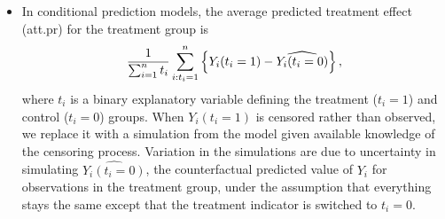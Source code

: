 \documentclass[letterpaper,10pt,english]{sphinxmanual}
\begin{document}
\begin{itemize}
\item {} 
In conditional prediction models, the average predicted treatment
effect (att.pr) for the treatment group is
\begin{gather}
\begin{split}\frac{1}{\sum_{i=1}^n t_i}\sum_{i:t_i=1}^n \left\{ Y_i(t_i=1) -
      \widehat{Y_i(t_i=0)} \right\},\end{split}\notag
\end{gather}
where \(t_i\) is a binary explanatory variable defining the
treatment (\(t_i=1\)) and control (\(t_i=0\)) groups. When
\(Y_i(t_i=1)\) is censored rather than observed, we replace it
with a simulation from the model given available knowledge of the
censoring process. Variation in the simulations are due to
uncertainty in simulating \(\widehat{Y_i(t_i=0)}\), the
counterfactual predicted value of \(Y_i\) for observations in the
treatment group, under the assumption that everything stays the same
except that the treatment indicator is switched to \(t_i=0\).

\end{itemize}
\end{document}
